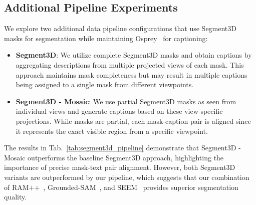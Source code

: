\subsection{Additional Pipeline Experiments}
We explore two additional data pipeline configurations that use Segment3D~\cite{huang2024segment3d} masks for segmentation while maintaining Osprey~\cite{yuan2024osprey} for captioning:
\begin{itemize}[leftmargin=*,itemsep=1pt]
    \item \textbf{Segment3D}: We utilize complete Segment3D masks and obtain captions by aggregating descriptions from multiple projected views of each mask. This approach maintains mask completeness but may result in multiple captions being assigned to a single mask from different viewpoints.
    \item \textbf{Segment3D - Mosaic}: We use partial Segment3D masks as seen from individual views and generate captions based on these view-specific projections. While masks are partial, each mask-caption pair is aligned since it represents the exact visible region from a specific viewpoint.
\end{itemize}
The results in Tab.~\ref{tab:segment3d_pipeline} demonstrate that Segment3D - Mosaic outperforms the baseline Segment3D approach, highlighting the importance of precise mask-text pair alignment.
However, both Segment3D variants are outperformed by our \nickname pipeline, which suggests that our combination of RAM++~\cite{ram_pp}, Grounded-SAM~\cite{ren2024grounded}, and SEEM~\cite{zou2024segment} provides superior segmentation quality.


